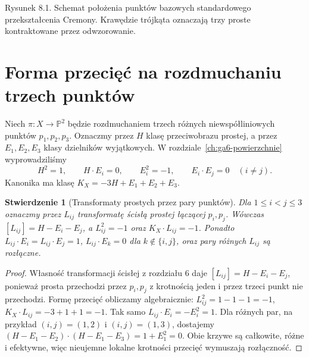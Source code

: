 \documentclass[11pt,a4paper,openany]{report}
\numberwithin{equation}{section}
\theoremstyle{plain}
\newtheorem{stwierdzenie}[twierdzenie]{Stwierdzenie}
\theoremstyle{definition}
\theoremstyle{remark}
\newcommand{\PP}{\mathbb P}
\begin{document}
\begin{center}

{\small Rysunek 8.1. Schemat położenia punktów bazowych
standardowego przekształcenia Cremony. Krawędzie trójkąta
oznaczają trzy proste kontraktowane przez odwzorowanie.}\par
\end{center}

\section{Forma przecięć na rozdmuchaniu trzech punktów}
\label{sec:ga8-classes}

Niech $\pi:X\to\PP^2$ będzie rozdmuchaniem
trzech różnych niewspółliniowych punktów $p_1,p_2,p_3$.
Oznaczmy przez $H$ klasę przeciwobrazu prostej,
a przez $E_1,E_2,E_3$ klasy dzielników wyjątkowych.
W rozdziale~\ref{ch:ga6-powierzchnie} wyprowadziliśmy
\[
H^2=1,\qquad H\cdot E_i=0,\qquad
E_i^2=-1,\qquad E_i\cdot E_j=0\quad(i\ne j).
\]
Kanonika ma klasę $K_X=-3H+E_1+E_2+E_3$.

\begin{stwierdzenie}[Transformaty prostych przez pary punktów]
\label{st:ga8-hexagon}
Dla $1\le i<j\le3$ oznaczmy przez $L_{ij}$
transformatę ścisłą prostej łączącej $p_i,p_j$.
Wówczas $[L_{ij}]=H-E_i-E_j$, a
$L_{ij}^2=-1$ oraz $K_X\cdot L_{ij}=-1$.
Ponadto $L_{ij}\cdot E_i=L_{ij}\cdot E_j=1$,
$L_{ij}\cdot E_k=0$ dla $k\notin\{i,j\}$,
oraz pary różnych $L_{ij}$ są rozłączne.
\end{stwierdzenie}
\begin{proof}
Własność transformacji ścisłej z rozdziału 6 daje
$[L_{ij}]=H-E_i-E_j$, ponieważ prosta przechodzi
przez $p_i,p_j$ z krotnością jeden i przez trzeci punkt
nie przechodzi. Formę przecięć obliczamy algebraicznie:
$L_{ij}^2=1-1-1=-1$,
$K_X\cdot L_{ij}=-3+1+1=-1$.
Tak samo $L_{ij}\cdot E_i= -E_i^2=1$.
Dla różnych par, na przykład $(i,j)=(1,2)$ i
$(i,j)=(1,3)$, dostajemy
$(H-E_1-E_2)\cdot(H-E_1-E_3)=1+E_1^2=0$.
Obie krzywe są całkowite, różne i efektywne, więc
nieujemne lokalne krotności przecięć wymuszają
rozłączność.
\end{proof}
\end{document}
